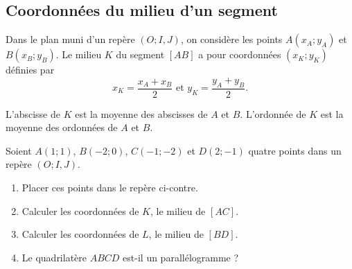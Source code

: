 \documentclass[11pt]{article}
\begin{document}

\subsection{Coordonnées du milieu d'un segment}
\begin{prop}
  Dans le plan muni d'un repère $(O; I, J)$, on considère les points $A(x_A;
  y_A)$ et $B(x_B; y_B)$. Le milieu $K$ du segment $\left[ AB \right]$ a pour
  coordonnées $(x_K; y_K)$ définies par
  \[
    x_K = \frac{x_A+x_B}{2}\text{ et }y_K = \frac{y_A+y_B}{2}.
  \]
\end{prop}
\begin{rmq}
  L'abscisse de $K$ est la moyenne des abscisses de $A$ et $B$. L'ordonnée de
  $K$ est la moyenne des ordonnées de $A$ et $B$.
\end{rmq}
\begin{exemple}
  \begin{minipage}{.6\textwidth}
  Soient $A(1; 1)$, $B(-2; 0)$, $C(-1; -2)$ et $D(2; -1)$ quatre points dans un
  repère $(O; I, J)$.
  \begin{enumerate}
    \item Placer ces points dans le repère ci-contre.
    \item Calculer les coordonnées de $K$, le milieu de $\left[ AC \right]$.
    \item Calculer les coordonnées de $L$, le milieu de $\left[ BD \right]$.
    \item Le quadrilatère $ABCD$ est-il un parallélogramme ?
  \end{enumerate}
\end{minipage}
  \begin{minipage}{.4\textwidth}
    \begin{center}
    \end{center}
  \end{minipage}
\end{exemple}
\end{document}
